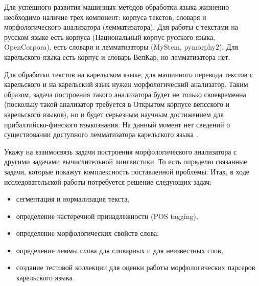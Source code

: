 Для успешного развития машинных методов обработки языка жизненно необходимо наличие трех компонент: корпуса текстов, словаря и морфологического анализатора (лемматизатора). Для работы с текстами на русском языке есть корпуса (Национальный корпус русского языка, OpenCorpora), есть словари и лемматизаторы (MyStem, pymorphy2). Для карельского языка есть корпус и словарь ВепКар, но лемматизатора нет.

Для обработки текстов на карельском языке, для машинного перевода текстов с карельского и на карельский язык нужен морфологический анализатор. Таким образом, задача построения такого анализатора будет не только своевременна (поскольку такой анализатор требуется в Открытом корпусе вепсского и карельского языков), но и будет серьезным научным достижением для прибалтийско-финского языкознания. На данный момент нет сведений о существовании доступного лемматизатора карельского языка .

Укажу на взаимосвязь задачи построения морфологического анализатора с другими задачами вычислительной лингвистики. То есть определю связанные задачи, которые покажут комплексность поставленной проблемы. Итак, в ходе исследовательской работы потребуется решение следующих задач:
\begin{itemize}
\item сегментация и нормализация текста,
\item определение частеречной принадлежности (POS tagging),
\item определение морфологических свойств слова,
\item определение леммы слова для словарных и для неизвестных слов,
\item создание тестовой коллекции для оценки работы морфологических парсеров карельского языка.
\end{itemize}
